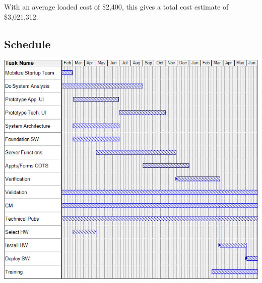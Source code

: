 \documentclass[11pt]{article}
\begin{document}
With an average loaded cost of \$2,400, this gives a total cost estimate of \$3,021,312.


\subsection{Schedule}
\includegraphics[width=\textwidth]{gantt.png}



\end{document}
